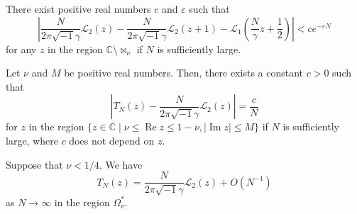 \documentclass[10pt,a4paper]{amsart}
\newcommand{\C}{\mathbb{C}}
\renewcommand{\Im}{\operatorname{Im}}
\renewcommand{\L}{\mathcal{L}}
\renewcommand{\Re}{\operatorname{Re}}
\renewcommand{\i}{\sqrt{-1}}
\begin{document}
\begin{lem}\label{lem:L2_L1}
There exist positive real numbers $c$ and $\varepsilon$ such that
\begin{equation*}
  \left|
    \frac{N}{2\pi\i\gamma}\L_2(z)
    -
    \frac{N}{2\pi\i\gamma}\L_2(z+1)
    -
    \L_1\left(\frac{N}{\gamma}z+\frac{1}{2}\right)
  \right|
  <
  ce^{-\varepsilon N}
\end{equation*}
for any $z$ in the region $\C\setminus\bowtie_{\nu}$ if $N$ is sufficiently large.
\end{lem}

\begin{lem}\label{lem:TN_L2}
Let $\nu$ and $M$ be positive real numbers.
Then, there exists a constant $c>0$ such that
\begin{equation*}
  \left|
    T_{N}(z)-\frac{N}{2\pi\i\gamma}\L_2(z)
  \right|
  =
  \frac{c}{N}
\end{equation*}
for $z$ in the region $\{z\in\C\mid\nu\le\Re{z}\le1-\nu,|\Im{z}|\le M\}$ if $N$ is sufficiently large, where $c$ does not depend on $z$.
\end{lem}

\begin{prop}\label{prop:TN_L2}
Suppose that $\nu<1/4$.
We have
\begin{equation*}
  T_{N}(z)
  =
  \frac{N}{2\pi\i\gamma}\L_2(z)
  +
  O(N^{-1})
\end{equation*}
as $N\to\infty$ in the region $\Omega^{\ast}_{\nu}$.
\end{prop}
\end{document}
